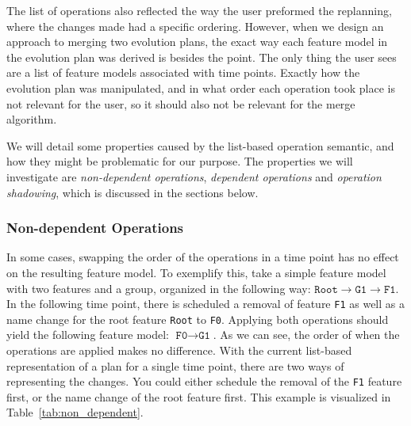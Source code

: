 \documentclass[a4paper,english]{ifimaster}
\begin{document}
The list of operations also reflected the way the user preformed the replanning, where the changes made had a specific ordering. However, when we design an approach to merging two evolution plans, the exact way each feature model in the evolution plan was derived is besides the point. The only thing the user sees are a list of feature models associated with time points. Exactly how the evolution plan was manipulated, and in what order each operation took place is not relevant for the user, so it should also not be relevant for the merge algorithm.

We will detail some properties caused by the list-based operation semantic, and how they might be problematic for our purpose. The properties we will investigate are \textit{non-dependent operations}, \textit{dependent operations} and \textit{operation shadowing}, which is discussed in the sections below.

\subsubsection{Non-dependent Operations}%
\label{ssub:non_dependent_operations}

In some cases, swapping the order of the operations in a time point has no effect on the resulting feature model. To exemplify this, take a simple feature model with two features and a group, organized in the following way: $\texttt{Root} \rightarrow \texttt{G1} \rightarrow \texttt{F1}$. In the following time point, there is scheduled a removal of feature \texttt{F1} as well as a name change for the root feature \texttt{Root} to \texttt{F0}. Applying both operations should yield the following feature model: $\texttt{F0} \rightarrow \texttt{G1}$. As we can see, the order of when the operations are applied makes no difference. With the current list-based representation of a plan for a single time point, there are two ways of representing the changes. You could either schedule the removal of the \texttt{F1} feature first, or the name change of the root feature first. This example is visualized in Table~\ref{tab:non_dependent}.
\end{document}
